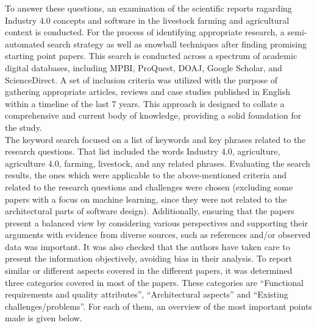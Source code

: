 To answer these questions, an examination of the scientific reports ragarding Industry 4.0 concepts and software in the livestock farming and agricultural context is conducted. For the process of identifying appropriate research, a semi-automated search strategy as well as snowball techniques after finding promising starting point papers. This search is conducted across a spectrum of academic digital databases, including MPBI, ProQuest, DOAJ, Google Scholar, and ScienceDirect. A set of inclusion criteria was utilized with the purpose of gathering appropriate articles, reviews and case studies published in English within a timeline of the last 7 years. This approach is designed to collate a comprehensive and current body of knowledge, providing a solid foundation for the study.
\vspace{2mm}
\\
The keyword search focused on a list of keywords and key phrases related to the research questions. That list included the words Industry 4.0, agriculture, agriculture 4.0, farming, livestock, and any related phrases. Evaluating the search results, the ones which were applicable to the above-mentioned criteria and related to the research questions and challenges were chosen (excluding some papers with a focus on machine learning, since they were not related to the architectural parts of software design).
Additionally, ensuring that the papers present a balanced view by considering various perspectives and supporting their arguments with evidence from diverse sources, such as references and/or observed data was important. It was also checked that the authors have taken care to present the information objectively, avoiding bias in their analysis.
\vspace{2mm}
\newline
To report similar or different aspects covered in the different papers, it was determined three categories covered in most of the papers. These categories are “Functional requirements and quality attributes”, “Architectural aspects” and “Existing challenges/problems”. For each of them, an overview of the most important points made is given below.
\newline
